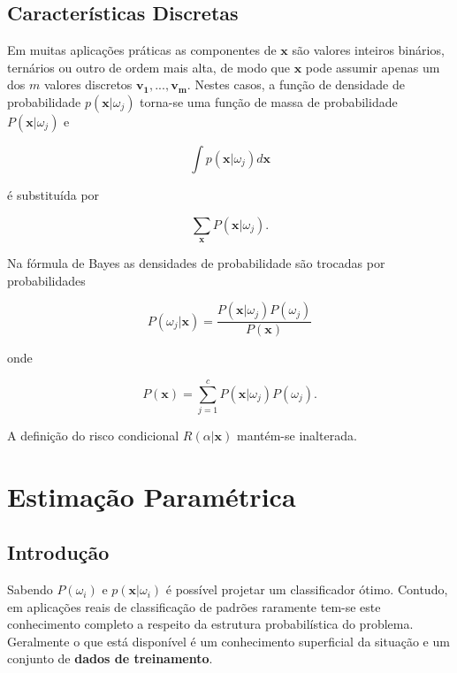 \documentclass[a4paper,12pt,twocolumn]{article}
\begin{document}
\subsection{Características Discretas}

Em muitas aplicações práticas as componentes de $\boldsymbol{x}$ são valores inteiros binários, ternários ou outro de ordem mais alta, de modo que $\boldsymbol{x}$ pode assumir apenas um dos $m$ valores discretos $\boldsymbol{v_1}, ..., \boldsymbol{v_m}$. Nestes casos, a função de densidade de probabilidade $p(\boldsymbol{x}|\omega_j)$ torna-se uma função de massa de probabilidade $P(\boldsymbol{x}|\omega_j)$ e

\begin{equation}
    \int p(\boldsymbol{x}|\omega_j) d\boldsymbol{x}
    \label{eq:integral_pdf}
\end{equation}

\noindent é substituída por

\begin{equation}
    \sum_{\boldsymbol{x}} P(\boldsymbol{x}|\omega_j).
    \label{eq:sum_pmf}
\end{equation}

\noindent Na fórmula de Bayes as densidades de probabilidade são trocadas por probabilidades

\begin{equation}
    P(\omega_j|\boldsymbol{x}) = \frac{P(\boldsymbol{x}|\omega_j)P(\omega_j)}{P(\boldsymbol{x})}
    \label{eq:bayes_discrete}
\end{equation}

onde

\begin{equation}
    P(\boldsymbol{x}) = \sum_{j=1}^c P(\boldsymbol{x}|\omega_j)P(\omega_j).
    \label{eq:bayes_discrete}
\end{equation}

A definição do risco condicional $R(\alpha|\boldsymbol{x})$ mantém-se inalterada.

\section{Estimação Paramétrica}

\subsection{Introdução}

Sabendo $P(\omega_i)$ e $p(\boldsymbol{x}|\omega_i)$ é possível projetar um classificador ótimo. Contudo, em aplicações reais de classificação de padrões raramente tem-se este conhecimento completo a respeito da estrutura probabilística do problema. Geralmente o que está disponível é um conhecimento superficial da situação e um conjunto de \textbf{dados de treinamento}.
\end{document}
